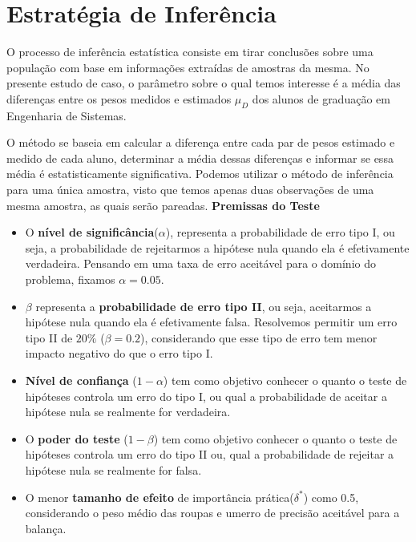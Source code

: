 \documentclass[12pt, a4paper]{article}
\begin{document}
\section{Estratégia de Inferência}
\label{sec:estrategia-inferencia}
O processo de inferência estatística consiste em tirar conclusões sobre uma população com base em informações extraídas de amostras da mesma. No presente estudo de caso, o parâmetro sobre o qual temos interesse é a média das diferenças entre os pesos medidos e estimados $\mu_{D}$ dos alunos de graduação em Engenharia de Sistemas.
\par O método se baseia em calcular a diferença entre cada par de pesos estimado e medido de cada aluno, determinar a média dessas diferenças e informar se essa média é estatisticamente significativa. Podemos utilizar o método de inferência para uma única amostra, visto que temos apenas duas observações de uma mesma amostra, as quais serão pareadas.
\newline
\newline
\textbf{Premissas do Teste}
\begin{itemize}
\item O \textbf{nível de significância}($\alpha$), representa a probabilidade de erro tipo I, ou seja, a probabilidade de rejeitarmos a hipótese nula quando ela é efetivamente verdadeira. Pensando em uma taxa de erro aceitável para o domínio do problema, fixamos $\alpha = 0.05$.
\item $\beta$ representa a \textbf{probabilidade de erro tipo II}, ou seja, aceitarmos a hipótese nula quando ela é efetivamente falsa. Resolvemos permitir um erro tipo II de $20\%$ ($\beta = 0.2$), considerando que esse tipo de erro tem menor impacto negativo do que o erro tipo I.
\item \textbf{Nível de confiança} ($1 - \alpha$) tem como objetivo conhecer o quanto o teste de hipóteses controla um erro do tipo I, ou qual a probabilidade de aceitar a hipótese nula se realmente for verdadeira. 
\item O \textbf{poder do teste} ($1 - \beta$) tem como objetivo conhecer o quanto o teste de hipóteses controla um erro do tipo II ou, qual a probabilidade de rejeitar a hipótese nula se realmente for falsa.
\item O menor \textbf{tamanho de efeito} de importância prática($\delta^*$) como 0.5, considerando o peso médio das roupas e umerro de precisão aceitável para a balança.
\end{itemize}
\end{document}
